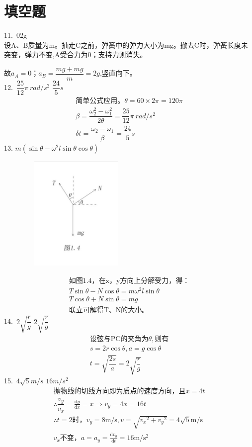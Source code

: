 \documentclass[b5paper,opensource]{./template/qyxf-book}
\newcommand{\di}[1]{\mathrm{d}#1}
\newcommand{\dy}[2]{\frac{\di{#1}}{\di{#2}}}
\begin{document}
\section{填空题}
11.\ 0\qquad2g\\
\indent
设A、B质量为m。抽走C之前，弹簧中的弹力大小为mg。撤去C时，弹簧长度未突变，弹力不变,A受合力为0；支持力则消失。\par
故$a_A=0；a_B=\dfrac{mg+mg}{m}=2g$,竖直向下。\\
12.\ $\dfrac{25}{12}\pi\ rad/s^2$ \qquad$\dfrac{24}{5}s$
\begin{gather*}
\text{简单公式应用。}\theta=60\times2\pi=120\pi\\
\beta=\dfrac{\omega_2^2-\omega_1^2}{2\theta}=\dfrac{25}{12}\pi\ rad/s^2\\
\delta t=\dfrac{\omega_2-\omega_1}{\beta}=\dfrac{24}{5}s
\end{gather*}
13. $m(\sin\theta-\omega^2l\sin\theta\cos\theta)$
\begin{figure}[htbp]
	\centering
	\includegraphics[width=15em, height=15em]{Chp1_illus4.png}
	\label{fig:c1}
\end{figure}
\begin{gather*}
\text{如图1.4，在x，y方向上分解受力，得：}\\		
T\sin\theta-N\cos\theta=m\omega^2l\sin\theta\\
T\cos\theta+N\sin\theta=mg\\
\text{联立可解得T、N的大小。}
\end{gather*}
14.\ $2\sqrt{\dfrac{r}{g}}$ \qquad $2\sqrt{\dfrac{r}{g}}$
\begin{gather*}
\text{设弦与PC的夹角为}\theta,\text{则有}\\
s=2r\cos\theta,a=g\cos\theta\\
t=\sqrt{\dfrac{2s}{a}}=2\sqrt{\dfrac{r}{g}}
\end{gather*}
15.\ $4\sqrt{5}m/s$ \qquad $16m/s^2 $ 
\begin{gather*}	
\text{抛物线的切线方向即为质点的速度方向，且}x=4t\\
\therefore \dfrac{v_y}{v_x}=\dy{y}{x}=x\Rightarrow v_y=4x=16t\\
\therefore t=2\text{时，}v_y=8\mathrm{m/s},
v=\sqrt{{v_x}^2+{v_y}^2}=4\sqrt{5}\mathrm{m/s}\\
v_x\text{不变，}a=a_y=\dy{v_y}{t}=16\mathrm{m/s^2}
\end{gather*}
\end{document}
